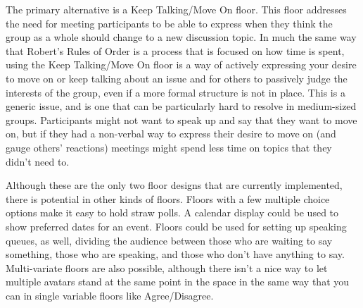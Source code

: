 The primary alternative is a Keep Talking/Move On floor. This floor addresses the need for meeting participants to be able to express when they think the group as a whole should change to a new discussion topic. In much the same way that Robert's Rules of Order \citep{RobertIII:2000tq} is a process that is focused on how time is spent, using the Keep Talking/Move On floor is a way of actively expressing your desire to move on or keep talking about an issue and for others to passively judge the interests of the group, even if a more formal structure is not in place. This is a generic issue, and is one that can be particularly hard to resolve in medium-sized groups. Participants might not want to speak up and say that they want to move on, but if they had a non-verbal way to express their desire to move on (and gauge others' reactions) meetings might spend less time on topics that they didn't need to.





Although these are the only two floor designs that are currently implemented, there is potential in other kinds of floors. Floors with a few multiple choice options make it easy to hold straw polls. A calendar display could be used to show preferred dates for an event. Floors could be used for setting up speaking queues, as well, dividing the audience between those who are waiting to say something, those who are speaking, and those who don't have anything to say. Multi-variate floors are also possible, although there isn't a nice way to let multiple avatars stand at the same point in the space in the same way that you can in single variable floors like Agree/Disagree.

